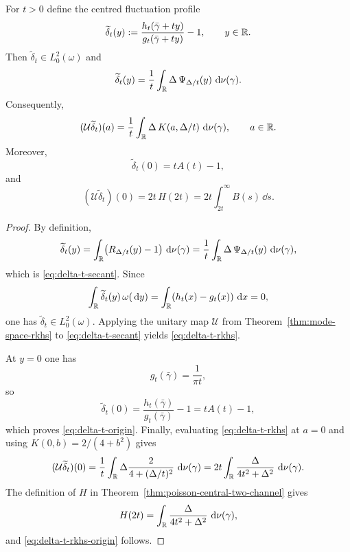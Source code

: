 \begin{theorem}%
\label{thm:poisson-channel-rkhs}
For $t>0$ define the centred fluctuation profile
\[
\widetilde\delta_t(y):=
\frac{h_t(\bar\gamma+ty)}{g_t(\bar\gamma+ty)}-1,
\qquad y\in\mathbb{R}.
\]
Then $\widetilde\delta_t\in L^2_0(\omega)$ and
\begin{equation}\label{eq:delta-t-secant}
\widetilde\delta_t(y)
=\frac{1}{t}\int_{\mathbb{R}}\Delta\,\Psi_{\Delta/t}(y)\,\,\mathrm{d}\nu(\gamma).
\end{equation}
Consequently,
\begin{equation}\label{eq:delta-t-rkhs}
(\mathcal U\widetilde\delta_t)(a)
=\frac{1}{t}\int_{\mathbb{R}}\Delta\,K(a,\Delta/t)\,\,\mathrm{d}\nu(\gamma),
\qquad a\in\mathbb{R}.
\end{equation}
Moreover,
\begin{equation}\label{eq:delta-t-origin}
\widetilde\delta_t(0)=tA(t)-1,
\end{equation}
and
\begin{equation}\label{eq:delta-t-rkhs-origin}
(\mathcal U\widetilde\delta_t)(0)=2t\,H(2t)
=2t\int_{2t}^{\infty}B(s)\,\dd s.
\end{equation}
\end{theorem}

\begin{proof}
By definition,
\[
\widetilde\delta_t(y)
=\int_{\mathbb{R}}\bigl(R_{\Delta/t}(y)-1\bigr)\,\,\mathrm{d}\nu(\gamma)
=\frac{1}{t}\int_{\mathbb{R}}\Delta\,\Psi_{\Delta/t}(y)\,\,\mathrm{d}\nu(\gamma),
\]
which is \eqref{eq:delta-t-secant}.  Since
\[
\int_{\mathbb{R}}\widetilde\delta_t(y)\,\omega(\,\mathrm{d} y)
=\int_{\mathbb{R}}(h_t(x)-g_t(x))\,\,\mathrm{d} x=0,
\]
one has $\widetilde\delta_t\in L^2_0(\omega)$.  Applying the unitary map
$\mathcal U$ from Theorem~\ref{thm:mode-space-rkhs} to
\eqref{eq:delta-t-secant} yields \eqref{eq:delta-t-rkhs}.

At $y=0$ one has
\[
g_t(\bar\gamma)=\frac{1}{\pi t},
\]
so
\[
\widetilde\delta_t(0)
=\frac{h_t(\bar\gamma)}{g_t(\bar\gamma)}-1
=tA(t)-1,
\]
which proves \eqref{eq:delta-t-origin}.  Finally, evaluating
\eqref{eq:delta-t-rkhs} at $a=0$ and using
$K(0,b)=2/(4+b^2)$ gives
\[
(\mathcal U\widetilde\delta_t)(0)
=\frac{1}{t}\int_{\mathbb{R}}\Delta\frac{2}{4+(\Delta/t)^2}\,\,\mathrm{d}\nu(\gamma)
=2t\int_{\mathbb{R}}\frac{\Delta}{4t^2+\Delta^2}\,\,\mathrm{d}\nu(\gamma).
\]
The definition of $H$ in
Theorem~\ref{thm:poisson-central-two-channel} gives
\[
H(2t)=\int_{\mathbb{R}}\frac{\Delta}{4t^2+\Delta^2}\,\,\mathrm{d}\nu(\gamma),
\]
and \eqref{eq:delta-t-rkhs-origin} follows.
\end{proof}

